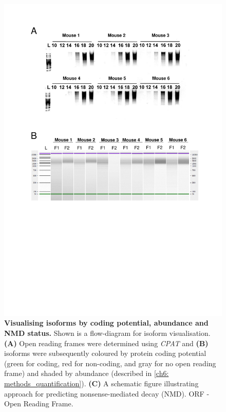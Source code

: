 \begin{figure}[htp]
	\centering
	\includegraphics[page=8,trim={0cm 1cm 0cm 0cm},clip,scale = 0.75]{Figures/TargetedTranscriptome_LabResults}
	\captionsetup{width=0.95\textwidth,singlelinecheck=off}
	\caption[Visualising isoforms by coding potential, abundance and NMD status]%
	{\textbf{Visualising isoforms by coding potential, abundance and NMD status.} Shown is a flow-diagram for isoform visualisation. \textbf{(A)} Open reading frames were determined using \textit{CPAT} and \textbf{(B)} isoforms were subsequently coloured by protein coding potential (green for coding, red for non-coding, and gray for no open reading frame) and shaded by abundance (described in \cref{ch6: methods_quantification}). \textbf{(C)} A schematic figure illustrating approach for predicting nonsense-mediated decay (NMD). ORF - Open Reading Frame. 
	}
	\label{fig:Targeted_isoforms_cpat}
\end{figure}

